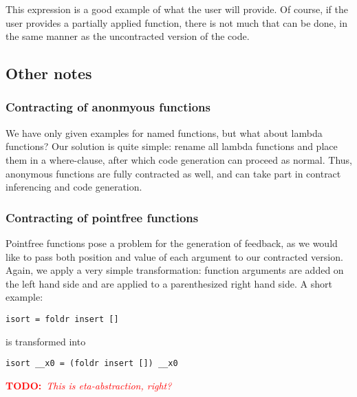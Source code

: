 \documentclass[10pt,a4paper]{article}
\newcommand{\annotate}[3]{
	\begin{scriptsize}
	\textcolor{#1}{\textbf{#2}~\textit{#3}}
	\end{scriptsize}\newline}
\newcommand{\todo}[1]{\annotate{red} {TODO:} {#1}}
\begin{document}
This expression is a good example of what the user will provide.
Of course, if the user provides a partially applied function, there is not much that can be done, in the same manner as the uncontracted version of the code.

\subsection{Other notes}

\subsubsection{Contracting of anonmyous functions}
We have only given examples for named functions, but what about lambda functions? Our solution is quite simple: rename all lambda functions and place them in a where-clause, after which code generation can proceed as normal.
Thus, anonymous functions are fully contracted as well, and can take part in contract inferencing and code generation.

\subsubsection{Contracting of pointfree functions}
Pointfree functions pose a problem for the generation of feedback, as we would like to pass both position and value of each argument to our contracted version.
Again, we apply a very simple transformation: function arguments are added on the left hand side and are applied to a parenthesized right hand side.
A short example:

\begin{lstlisting}
isort = foldr insert []
\end{lstlisting}

is transformed into

\begin{lstlisting}
isort __x0 = (foldr insert []) __x0
\end{lstlisting}

\todo{This is eta-abstraction, right?}
\end{document}
